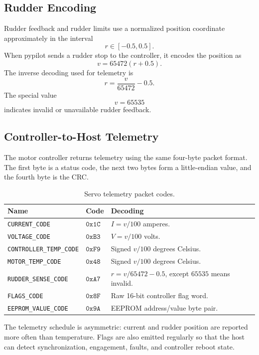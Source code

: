 \documentclass[11pt,twocolumn]{article}
\begin{document}
\subsection{Rudder Encoding}
Rudder feedback and rudder limits use a normalized position coordinate
approximately in the interval
\[
r \in [-0.5,0.5].
\]
When pypilot sends a rudder stop to the controller, it encodes the
position as
\[
v = 65472(r+0.5).
\]
The inverse decoding used for telemetry is
\[
r = \frac{v}{65472} - 0.5.
\]
The special value
\[
v = 65535
\]
indicates invalid or unavailable rudder feedback.
\subsection{Controller-to-Host Telemetry}
The motor controller returns telemetry using the same four-byte packet
format.  The first byte is a status code, the next two bytes form a
little-endian value, and the fourth byte is the CRC.
\begin{table}[h]
\centering
\caption{Servo telemetry packet codes.}
\label{tab:pypilot-servo-telemetry}
\begin{tabularx}{\columnwidth}{Z{0.42\columnwidth}Z{0.17\columnwidth}Y}
\toprule
Name & Code & Decoding \\
\midrule
\texttt{CURRENT\_CODE} &
\(\mathtt{0x1C}\) &
\(I = v/100\) amperes. \\
\texttt{VOLTAGE\_CODE} &
\(\mathtt{0xB3}\) &
\(V = v/100\) volts. \\
\texttt{CONTROLLER\_TEMP\_CODE} &
\(\mathtt{0xF9}\) &
Signed \(v/100\) degrees Celsius. \\
\texttt{MOTOR\_TEMP\_CODE} &
\(\mathtt{0x48}\) &
Signed \(v/100\) degrees Celsius. \\
\texttt{RUDDER\_SENSE\_CODE} &
\(\mathtt{0xA7}\) &
\(r = v/65472 - 0.5\), except \(65535\) means invalid. \\
\texttt{FLAGS\_CODE} &
\(\mathtt{0x8F}\) &
Raw 16-bit controller flag word. \\
\texttt{EEPROM\_VALUE\_CODE} &
\(\mathtt{0x9A}\) &
EEPROM address/value byte pair. \\
\bottomrule
\end{tabularx}
\end{table}
The telemetry schedule is asymmetric: current and rudder position are
reported more often than temperature.  Flags are also emitted regularly
so that the host can detect synchronization, engagement, faults, and
controller reboot state.
\end{document}
